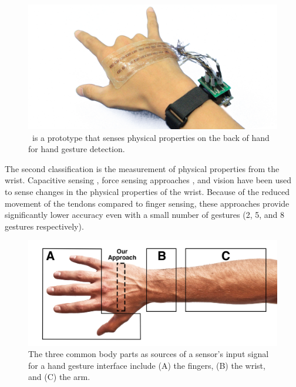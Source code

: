 \documentclass{sigchi}
\begin{document}
\begin{figure}
  \begin{center}
  \includegraphics[width=1\columnwidth]{figures/BackHand.jpg}
  \caption{\getTitleName\ is a prototype that senses physical properties on the back of hand for hand gesture detection.}
  \label{fig:FIGURE1}
  \end{center}
\end{figure}

The second classification is the measurement of physical properties from the wrist. Capacitive sensing \cite{Rekimoto:2001:GGU:580581.856565}, force sensing approaches \cite{Dementyev:2014:WLG:2642918.2647396}, and vision \cite{Fukui:2011:HSC:2030112.2030154} have been used to sense changes in the physical properties of the wrist. Because of the reduced movement of the tendons compared to finger sensing, these approaches provide significantly lower accuracy even with a small number of gestures (2, 5, and 8 gestures respectively).

\begin{figure}[b]
  \begin{center}
  \includegraphics[width=1\columnwidth]{figures/HandTarget.jpg}
  \caption{The three common body parts as sources of a sensor's input signal for a hand gesture interface include (A) the fingers, (B) the wrist, and (C) the arm.}
  \label{fig:HandTarget}
  \end{center}
\end{figure}
\end{document}
